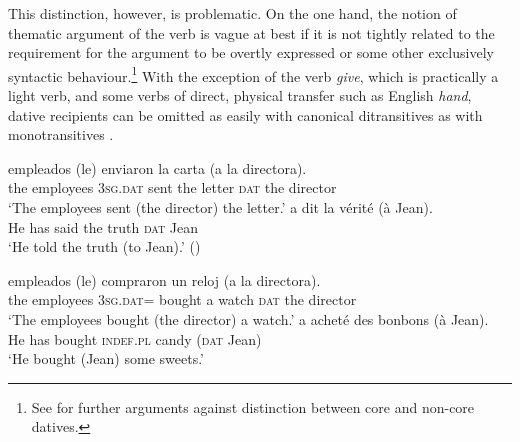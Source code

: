 \documentclass[output=paper,colorlinks,citecolor=brown,nonflat]{./langscibook}
\begin{document}
This distinction, however, is problematic. On the one hand, the notion of thematic argument of the verb is vague at best if it is not tightly related to the requirement for the argument to be overtly expressed or some other exclusively syntactic behaviour.\footnote{See \citet{FernándezAlcalde2014} for further arguments against  distinction between core and non-core datives.}  With the exception of the verb \textit{give}, which is practically a light verb, and some verbs of direct, physical transfer such as English \textit{hand}, dative recipients can be omitted as easily with canonical ditransitives  as with monotransitives . 

\ea%
    \label{ex:cuervo:1}
    \ea%
        \label{ex:cuervo:1a}
         {empleados} {(le)}  {enviaron}  {la} {carta} {(a} {la} {directora).}\\
             the employees {3\textsc{sg.dat}} sent        the letter \textsc{dat} the director\\
        \glt ‘The employees sent (the director) the letter.’
    \ex%
        \label{ex:cuervo:1b}
         {a} {dit} {la} {vérité} {(à} {Jean)}.\\
        He has said the truth \textsc{dat} Jean\\
        \glt ‘He told the truth (to Jean).’  (\citealt{BonehNash2012}) 
    \z
\z



\ea%
    \label{ex:cuervo:2}
    \ea%
        \label{ex:cuervo:2a}
         {empleados} {(le)} {compraron} {un} {reloj} {(a} {la} {directora)}.\\
                   the employees {\textsc{3sg.dat}=} bought a watch \textsc{dat} the director\\
        \glt ‘The employees bought (the director) a watch.’
    \ex%
        \label{ex:cuervo:2b}
         {a} {acheté} {des} {bonbons} {(à} {Jean)}.\\
        He has bought {\textsc{indef.pl}} candy (\textsc{dat} Jean)\\
        \glt ‘He bought (Jean) some sweets.’
    \z
\z
\end{document}
